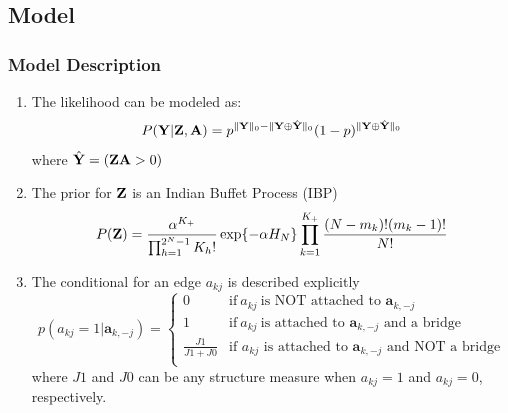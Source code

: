 \documentclass{beamer}
\newcommand{\ba}{\textbf{a}}
\newcommand{\A}{{\bf A}}
\newcommand{\Y}{{\bf Y}}
\newcommand{\Z}{{\bf Z}}
\begin{document}
\subsection{Model}
\begin{frame}
\frametitle{Model Description}
\fontsize{6pt}{7.2}\selectfont

\begin{enumerate}
	\item The likelihood can be modeled as:
$$ P(\Y|\Z,\A) = p^{\|\Y\|_0 - \|\Y \oplus \hat\Y\|_0} (1-p)^{\|\Y \oplus \hat\Y\|_0} $$ where $\hat\Y = (\Z\A>0)$

	\item The prior for $\Z$ is an Indian Buffet Process (IBP) $$ P(\Z) = \frac{\alpha^{K_+}}{\prod_{h=1}^{2^N-1}K_h!}\exp\{-\alpha H_N\}\prod_{k=1}^{K_+}\frac{(N-m_k)!(m_k-1)!}{N!} $$

	\item The conditional for an edge $a_{kj}$ is described explicitly 
\begin{equation*}
		p(a_{kj}=1|\ba_{k,-j}) = \begin{cases}			
			0 & \text{if}\  a_{kj}\  \text{is NOT attached to $\ba_{k,-j}$} \\
			1 & \text{if}\  a_{kj}\  \text{is attached to $\ba_{k,-j}$ and a bridge} \\
			\frac{J1}{J1+J0} & \text{if $a_{kj}$ is attached to $\ba_{k,-j}$ and NOT a bridge} \\
		\end{cases}		
\end{equation*}
where $J1$ and $J0$ can be any structure measure when $a_{kj}=1$ and $a_{kj}=0$, respectively.
\end{enumerate}

\end{frame}
\end{document}
